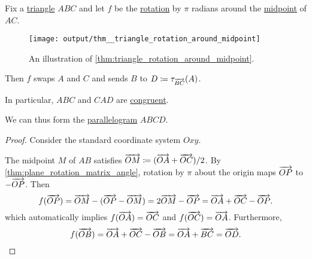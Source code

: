 \begin{lemma}\label{thm:triangle_rotation_around_midpoint}
  Fix a \hyperref[def:triangle]{triangle} \( ABC \) and let \( f \) be the \hyperref[def:rigid_motion/rotation]{rotation} by \( \pi \) radians around the \hyperref[thm:segment_midpoint]{midpoint} of \( AC \).

  \begin{figure}[!ht]
    \centering
    \texttt{[image: output/thm\_\_triangle\_rotation\_around\_midpoint]}
    \caption{An illustration of \cref{thm:triangle_rotation_around_midpoint}.}\label{fig:thm:triangle_rotation_around_midpoint}
  \end{figure}

  Then \( f \) swaps \( A \) and \( C \) and sends \( B \) to \( D \coloneqq \tau_{\overrightarrow{BC}}(A) \).
\end{lemma}
\begin{comments}
  \item In particular, \( ABC \) and \( CAD \) are \hyperref[def:congruent_shapes]{congruent}.
  \item We can thus form the \hyperref[def:parallelogram]{parallelogram} \( ABCD \).
\end{comments}
\begin{proof}
  Consider the standard coordinate system \( Oxy \).

  The midpoint \( M \) of \( AB \) satisfies \( \overrightarrow{OM} \coloneqq (\overrightarrow{OA} + \overrightarrow{OC}) / 2 \). By \cref{thm:plane_rotation_matrix_angle}, rotation by \( \pi \) about the origin maps \( \overrightarrow{OP} \) to \( -\overrightarrow{OP} \). Then
  \begin{equation*}
    f(\overrightarrow{OP}) = \overrightarrow{OM} - (\overrightarrow{OP} - \overrightarrow{OM}) = 2\overrightarrow{OM} - \overrightarrow{OP} = \overrightarrow{OA} + \overrightarrow{OC} - \overrightarrow{OP}.
  \end{equation*}
  which automatically implies \( f(\overrightarrow{OA}) = \overrightarrow{OC} \) and \( f(\overrightarrow{OC}) = \overrightarrow{OA} \). Furthermore,
  \begin{equation*}
    f(\overrightarrow{OB}) = \overrightarrow{OA} + \overrightarrow{OC} - \overrightarrow{OB} = \overrightarrow{OA} + \overrightarrow{BC} = \overrightarrow{OD}.
  \end{equation*}
\end{proof}

